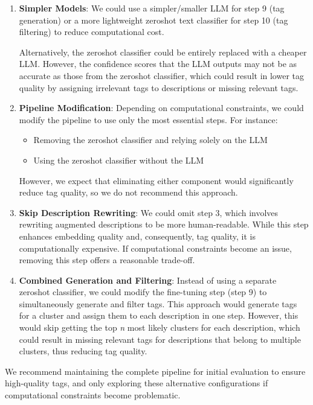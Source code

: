 \begin{enumerate}
    \item \textbf{Simpler Models}: We could use a simpler/smaller LLM for step 9 (tag generation) or a more lightweight zeroshot text classifier \cite{noauthor_moritzlaurerdeberta-v3-large-zeroshot-v20_2024} for step 10 (tag filtering) to reduce computational cost. 
    
    Alternatively, the zeroshot classifier could be entirely replaced with a cheaper LLM. However, the confidence scores that the LLM outputs may not be as accurate as those from the zeroshot classifier, which could result in lower tag quality by assigning irrelevant tags to descriptions or missing relevant tags.
    
    \item \textbf{Pipeline Modification}: Depending on computational constraints, we could modify the pipeline to use only the most essential steps. For instance:
    \begin{itemize}
        \item Removing the zeroshot classifier and relying solely on the LLM
        \item Using the zeroshot classifier without the LLM
    \end{itemize}
    However, we expect that eliminating either component would significantly reduce tag quality, so we do not recommend this approach.
    
    \item \textbf{Skip Description Rewriting}: We could omit step 3, which involves rewriting augmented descriptions to be more human-readable. While this step enhances embedding quality and, consequently, tag quality, it is computationally expensive. If computational constraints become an issue, removing this step offers a reasonable trade-off.
    
    \item \textbf{Combined Generation and Filtering}: Instead of using a separate zeroshot classifier, we could modify the fine-tuning step (step 9) to simultaneously generate and filter tags. This approach would generate tags for a cluster and assign them to each description in one step. However, this would skip getting the top \textit{n} most likely clusters for each description, which could result in missing relevant tags for descriptions that belong to multiple clusters, thus reducing tag quality.
\end{enumerate}

We recommend maintaining the complete pipeline for initial evaluation to ensure high-quality tags, and only exploring these alternative configurations if computational constraints become problematic.

